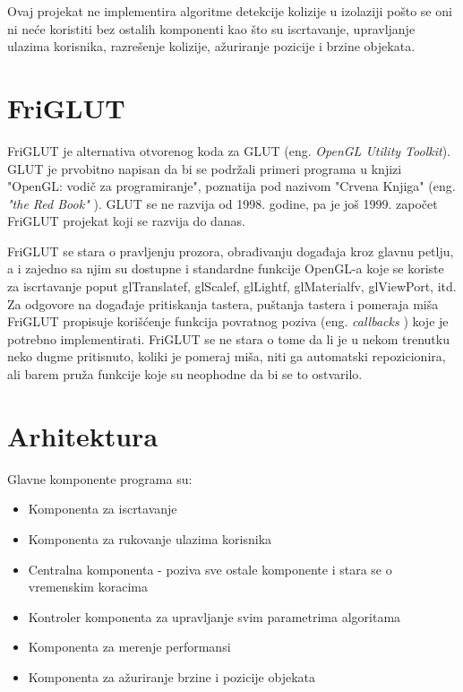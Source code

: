 \documentclass[12pt,oneside]{memoir}
\begin{document}
Ovaj projekat ne implementira algoritme detekcije kolizije u izolaziji pošto 
se oni ni neće koristiti bez ostalih komponenti kao što su iscrtavanje, 
upravljanje ulazima korisnika, razrešenje kolizije, ažuriranje pozicije i brzine objekata.

\section{FriGLUT}

FriGLUT je alternativa otvorenog koda za GLUT (eng. {\em OpenGL Utility Toolkit}). 
GLUT je prvobitno napisan da bi se podržali primeri programa u knjizi "OpenGL:
vodič za programiranje", poznatija pod nazivom "Crvena Knjiga" (eng. {\em "the Red Book" }).
GLUT se ne razvija od 1998. godine, pa je još 1999. započet FriGLUT projekat koji 
se razvija do danas. 
\cite{freeglut}

FriGLUT se stara o pravljenju prozora, obrađivanju događaja kroz glavnu petlju,
a i zajedno sa njim su dostupne i standardne funkcije OpenGL-a koje se koriste
za iscrtavanje poput glTranslatef, glScalef, glLightf, glMaterialfv, glViewPort, itd.
Za odgovore na događaje pritiskanja tastera, puštanja tastera i pomeraja miša
FriGLUT propisuje korišćenje funkcija povratnog poziva  (eng. {\em callbacks }) koje je potrebno implementirati.
FriGLUT se ne stara o tome da li je u nekom trenutku neko dugme pritisnuto, 
koliki je pomeraj miša, niti ga automatski repozicionira, ali barem pruža 
funkcije koje su neophodne da bi se to ostvarilo.

\section{Arhitektura}

Glavne komponente programa su:
\begin{itemize}
	\item Komponenta za iscrtavanje
	\item Komponenta za rukovanje ulazima korisnika
	\item Centralna komponenta - poziva sve ostale komponente i stara se o vremenskim koracima
	\item Kontroler komponenta za upravljanje svim parametrima algoritama
	\item Komponenta za merenje performansi
	\item Komponenta za ažuriranje brzine i pozicije objekata
\end{itemize}
\end{document}
